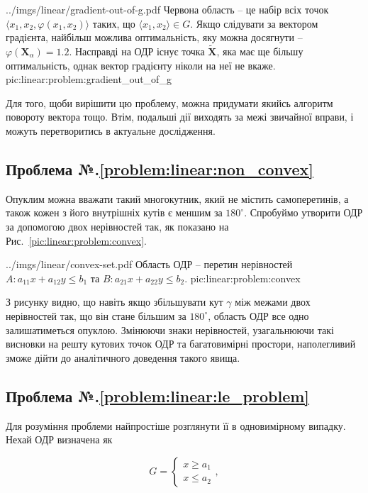 \documentclass[\main/book.tex]{subfiles}
\begin{document}
\illustration
 {../imgs/linear/gradient-out-of-g.pdf}
 {Червона область -- це набір всіх точок $\langle x_1, x_2, \varphi(x_1, x_2)\rangle$ таких, що $\langle x_1, x_2 \rangle \in G$. Якщо слідувати за вектором градієнта, найбільш можлива оптимальність, яку можна досягнути -- $\varphi(\mathbf{X}_\alpha)=1.2$. Насправді на ОДР існує точка $\widetilde{\mathbf{X}}$, яка має ще більшу оптимальність, однак вектор градієнту ніколи на неї не вкаже.}
 {pic:linear:problem:gradient_out_of_g}

Для того, щоби вирішити цю проблему, можна придумати якийсь алгоритм повороту вектора тощо. Втім, подальші дії виходять за межі звичайної вправи, і можуть перетворитись в актуальне дослідження.

\subsection*{Проблема №.\ref{problem:linear:non_convex}}

Опуклим можна вважати такий многокутник, який не містить самоперетинів, а також кожен з його внутрішніх кутів є меншим за $180^\circ$. Спробуймо утворити ОДР за допомогою двох нерівностей так, як показано на Рис.~\ref{pic:linear:problem:convex}.

\illustration
 {../imgs/linear/convex-set.pdf}
 {Область ОДР -- перетин нерівностей ${A: a_{11} x + a_{12} y \leq b_1}$ та ${B: a_{21} x + a_{22} y \leq b_2}$.}
 {pic:linear:problem:convex}

З рисунку видно, що навіть якщо збільшувати кут $\gamma$ між межами двох нерівностей так, що він стане більшим за $180^\circ$, область ОДР все одно залишатиметься опуклою. Змінюючи знаки нерівностей, узагальнюючи такі висновки на решту кутових точок ОДР та багатовимірні простори, наполегливий зможе дійти до аналітичного доведення такого явища.

\subsection*{Проблема №.\ref{problem:linear:le_problem}}

Для розуміння проблеми найпростіше розглянути її в одновимірному випадку. Нехай ОДР визначена як

\[
 G = \left\{
  \begin{array}{l}
   x \geq a_1 \\
   x \leq a_2
  \end{array}
 \right.,
\]
\end{document}
